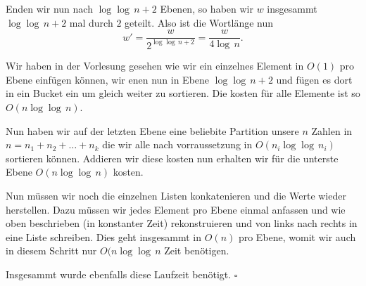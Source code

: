 \documentclass[11pt,a4paper,ngerman]{article}
\begin{document}
Enden wir nun nach $\log \log \, n + 2$ Ebenen, so haben wir  $w$ insgesammt $\log \log \, n + 2$ mal durch $2$ geteilt.
Also ist die Wortlänge nun
$$
	w' = \frac{w}{2^{\log \log \, n + 2}} = \frac{w}{4\log \,n}.
$$

Wir haben in der Vorlesung gesehen wie wir ein einzelnes Element in $O(1)$ pro Ebene einfügen können,  wir enen nun in Ebene $\log \log \, n +2$ und fügen es dort in ein Bucket ein um gleich weiter zu sortieren. Die kosten für alle Elemente ist so $O(n \log \log \, n)$.

Nun haben wir auf der letzten Ebene eine beliebite Partition unsere $n$ Zahlen in $n = n_1 + n_2 + \ldots + n_k$ die wir alle nach vorraussetzung in $O(n_i \log\log \, n_i)$ sortieren können.
Addieren wir diese kosten nun erhalten wir für die unterste Ebene $O(n \log \log \, n)$ kosten.

Nun müssen wir noch die einzelnen Listen konkatenieren und die Werte wieder herstellen. Dazu müssen wir jedes Element pro Ebene einmal anfassen und wie oben beschrieben (in konstanter Zeit) rekonstruieren und von links nach rechts in eine Liste schreiben. Dies geht insgesammt in $O(n)$ pro Ebene, womit wir auch in diesem Schritt nur $O(n \log \log \, n$ Zeit benötigen.

Insgesammt wurde ebenfalls diese Laufzeit benötigt.
\mbox{}\hfill$\square$
\label{LastPage}
\end{document}
